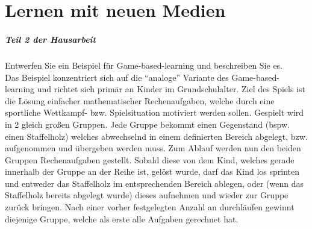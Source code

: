 %
\chapter{Lernen mit neuen Medien}
\label{sec:lernen-mit-neuen-medien}

\paragraph{Teil 2 der Hausarbeit}
Entwerfen Sie ein Beispiel für Game-based-learning und beschreiben Sie es. \\[0.4em]

Das Beispiel konzentriert sich auf die “analoge” Variante des Game-based-learning und richtet sich primär an Kinder im Grundschulalter. Ziel des Spiels ist die Lösung einfacher mathematischer Rechenaufgaben, welche durch eine sportliche Wettkampf- bzw. Spielsituation motiviert werden sollen.
Gespielt wird in 2 gleich großen Gruppen. Jede Gruppe bekommt einen Gegenstand (bspw. einen Staffelholz) welches abwechselnd in einem definierten Bereich abgelegt, bzw. aufgenommen und übergeben werden muss. 
Zum Ablauf werden nun den beiden Gruppen Rechenaufgaben gestellt. Sobald diese von dem Kind, welches gerade innerhalb der Gruppe an der Reihe ist, gelöst wurde, darf das Kind los sprinten und entweder das Staffelholz im entsprechenden Bereich ablegen, oder (wenn das Staffelholz bereits abgelegt wurde) dieses aufnehmen und wieder zur Gruppe zurück bringen.
Nach einer vorher festgelegten Anzahl an durchläufen gewinnt diejenige Gruppe, welche als erste alle Aufgaben gerechnet hat.
